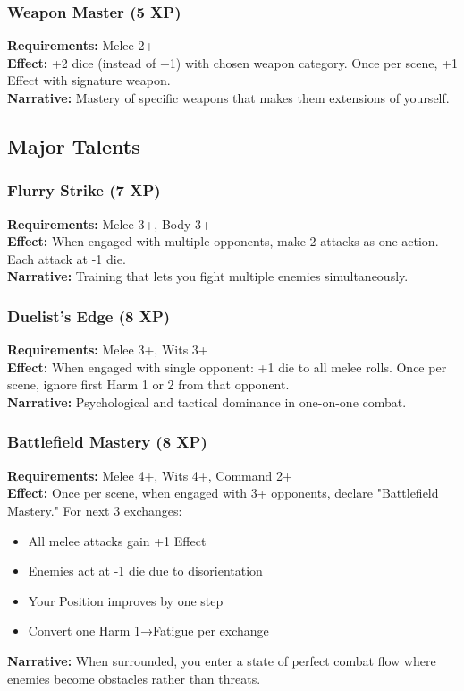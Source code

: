 \subsubsection{Weapon Master (5 XP)}
\textbf{Requirements:} Melee 2+ \\
\textbf{Effect:} +2 dice (instead of +1) with chosen weapon category. Once per scene, +1 Effect with signature weapon. \\
\textbf{Narrative:} Mastery of specific weapons that makes them extensions of yourself.

\subsection{Major Talents}

\subsubsection{Flurry Strike (7 XP)}
\textbf{Requirements:} Melee 3+, Body 3+ \\
\textbf{Effect:} When engaged with multiple opponents, make 2 attacks as one action. Each attack at -1 die. \\
\textbf{Narrative:} Training that lets you fight multiple enemies simultaneously.

\subsubsection{Duelist's Edge (8 XP)}
\textbf{Requirements:} Melee 3+, Wits 3+ \\
\textbf{Effect:} When engaged with single opponent: +1 die to all melee rolls. Once per scene, ignore first Harm 1 or 2 from that opponent. \\
\textbf{Narrative:} Psychological and tactical dominance in one-on-one combat.

\subsubsection{Battlefield Mastery (8 XP)}
\textbf{Requirements:} Melee 4+, Wits 4+, Command 2+ \\
\textbf{Effect:} Once per scene, when engaged with 3+ opponents, declare "Battlefield Mastery." For next 3 exchanges:
\begin{itemize}
    \item All melee attacks gain +1 Effect
    \item Enemies act at -1 die due to disorientation
    \item Your Position improves by one step
    \item Convert one Harm 1→Fatigue per exchange
\end{itemize}
\textbf{Narrative:} When surrounded, you enter a state of perfect combat flow where enemies become obstacles rather than threats.

